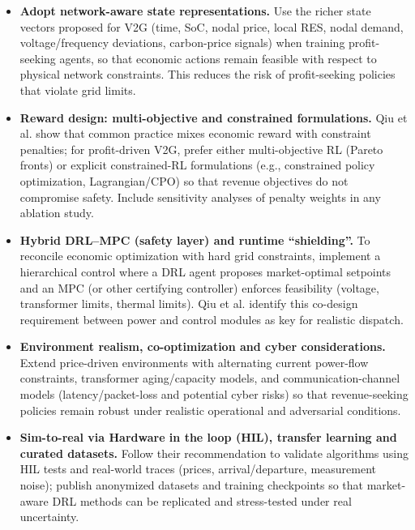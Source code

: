 \begin{itemize}
\begin{itemize}
    \item \textbf{Adopt network-aware state representations.} Use the richer state vectors proposed for V2G (time, SoC, nodal price, local RES, nodal demand, voltage/frequency deviations, carbon-price signals) when training profit-seeking agents, so that economic actions remain feasible with respect to physical network constraints. This reduces the risk of profit-seeking policies that violate grid limits.

    \item \textbf{Reward design: multi-objective and constrained formulations.} Qiu et al.\cite{Qiu2023} show that common practice mixes economic reward with constraint penalties; for profit-driven V2G, prefer either multi-objective RL (Pareto fronts) or explicit constrained-RL formulations (e.g., constrained policy optimization, Lagrangian/CPO) so that revenue objectives do not compromise safety. Include sensitivity analyses of penalty weights in any ablation study. 

    \item \textbf{Hybrid DRL--MPC (safety layer) and runtime ``shielding''.} To reconcile economic optimization with hard grid constraints, implement a hierarchical control where a DRL agent proposes market-optimal setpoints and an MPC (or other certifying controller) enforces feasibility (voltage, transformer limits, thermal limits). Qiu et al.\cite{Qiu2023} identify this co-design requirement between power and control modules as key for realistic dispatch. 

    \item \textbf{Environment realism, co-optimization and cyber considerations.} Extend price-driven environments with alternating current power-flow constraints, transformer aging/capacity models, and communication-channel models (latency/packet-loss and potential cyber risks) so that revenue-seeking policies remain robust under realistic operational and adversarial conditions. 
    \item \textbf{Sim-to-real via  Hardware in the loop (HIL), transfer learning and curated datasets.} Follow their recommendation to validate algorithms using HIL tests and real-world traces (prices, arrival/departure, measurement noise); publish anonymized datasets and training checkpoints so that market-aware DRL methods can be replicated and stress-tested under real uncertainty.
\end{itemize}


\end{itemize}
